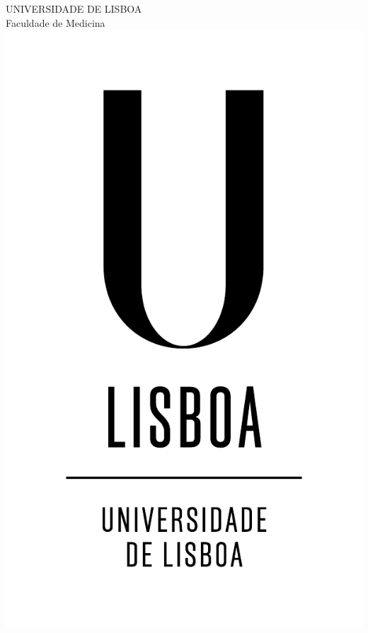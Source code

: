 \thispagestyle{empty}

\begin{center}
    {\FontMn UNIVERSIDADE DE LISBOA} \\
    {\FontMn Faculdade de Medicina} \\
    
    \includegraphics[bb=9cm 16cm 0cm 0cm, scale=0.3]{base-figures/ULISBOA_VERTICAL_RGB.pdf}
    
    \vspace{5cm}
    

\end{center}
